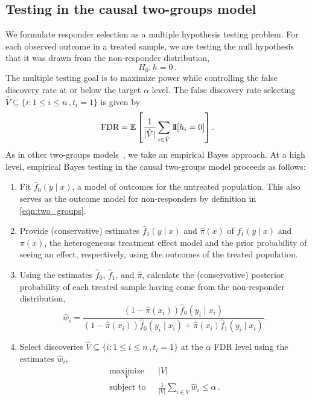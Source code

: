 %
%
%
%
%
%
%
%
%
%
%
%
%
%
%
%
%
%
%
%



%

\subsection{Testing in the causal two-groups model}
\label{subsec:model:empirical_bayes_testing}
We formulate responder selection as a multiple hypothesis testing problem.
For each observed outcome in a treated sample, we are testing the null hypothesis that it was drawn from the non-responder distribution,
\[
H_0 \colon h = 0 \, .
\]
The multiple testing goal is to maximize power while controlling the false discovery rate at or below the target $\alpha$ level. The false discovery rate selecting $\hat{V} \subseteq \{ i \colon 1 \leq i \leq n \, , t_i = 1 \}$ is given by
\[ \text{FDR} = \mathbb{E}\left[ \frac{1}{|\hat{V}|} \sum_{i \in \hat{V}} \operatorname*{1{\hskip -2.5 pt}\hbox{I}}[h_i = 0] \right] .\]
As in other two-groups models~\citep{efron:2004,efron:2008,efron2012,scott:etal:2014:fdr-regression,tansey:etal:2018:fdr-smoothing,tansey:etal:icml:2018:bbfdr}, we take an empirical Bayes approach.
At a high level, empirical Bayes testing in the causal two-groups model proceeds as follows:
\begin{enumerate}
    \item Fit $\hat{f}_0(y \mid x)$, a model of outcomes for the untreated population. This also serves as the outcome model for non-responders by definition in \cref{eqn:two_groups}.
    \item Provide (conservative) estimates $\hat{f}_1(y \mid x)$ and $\hat{\pi}(x)$ of $f_1(y \mid x)$ and $\pi(x)$, the heterogeneous treatment effect model and the prior probability of seeing an effect, respectively, using the outcomes of the treated population.
    \item Using the estimates $\hat{f}_0$, $\hat{f}_1$, and $\hat{\pi}$, calculate the (conservative) posterior probability of each treated sample having come from the non-responder distribution,
    \[ \hat{w}_i = \frac{(1-\hat{\pi}(x_i))\hat{f}_0(y_i \mid x_i)}{(1-\hat{\pi}(x_i))\hat{f}_0(y_i \mid x_i) + \hat{\pi}(x_i)\hat{f}_1(y_i \mid x_i)}. \]
    \item Select discoveries $\hat{V} \subseteq \{ i \colon 1 \leq i \leq n \, , t_i = 1 \}$ at the $\alpha$ FDR level using the estimates $\hat{w}_i$,
            \begin{equation}
            \label{eqn:selection}
            \begin{aligned}
            \underset{V}{\text{maximize}} & \mbox{ } |V| \\
             \text{subject to} & \mbox{ } \frac{1}{|V|} \sum_{i \in V} \hat{w}_i \leq \alpha \, .
            \end{aligned}
            \end{equation}
\end{enumerate}
